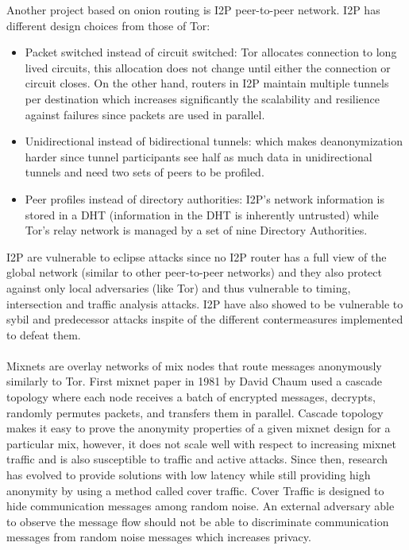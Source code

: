 Another project based on onion routing is I2P peer-to-peer network. I2P has different design choices from those of Tor:
\begin{itemize}
    \item Packet switched instead of circuit switched: Tor allocates connection to long lived circuits, this allocation does not change until either the connection or circuit closes. On the other hand, routers in I2P maintain multiple tunnels per destination which increases significantly the scalability and resilience against failures since packets are used in parallel.
    \item Unidirectional instead of bidirectional tunnels: which makes deanonymization harder since tunnel participants see half as much data in unidirectional tunnels and need two sets of peers to be profiled.
    \item Peer profiles instead of directory authorities: I2P’s network information is stored in a DHT (information in the DHT is inherently untrusted) while Tor’s relay network is managed by a set of nine Directory Authorities.

\end{itemize}
I2P are vulnerable to eclipse attacks since no I2P router has a full view of the global network (similar to other peer-to-peer networks) and they also protect against only local adversaries (like Tor) and thus vulnerable to timing, intersection and traffic analysis attacks. I2P have also showed to be vulnerable to sybil and predecessor attacks inspite of the different contermeasures implemented to defeat them.
\\~\\Mixnets are overlay networks of mix nodes that route messages anonymously similarly to Tor. First mixnet paper in 1981 by David Chaum \cite{mixnets} used a cascade topology where each node receives a batch of encrypted messages, decrypts, randomly permutes packets, and transfers them in parallel. Cascade topology makes it easy to prove the anonymity properties of a given mixnet design for a particular mix, however, it does not scale well with respect to increasing mixnet traffic and is also susceptible to traffic and active attacks. Since then, research has evolved to provide solutions with low latency while still providing high anonymity by using a method called cover traffic. Cover Traffic is designed to hide communication messages among random noise. An external adversary able to observe the message flow should not be able to discriminate communication messages from random noise messages which increases privacy. 

